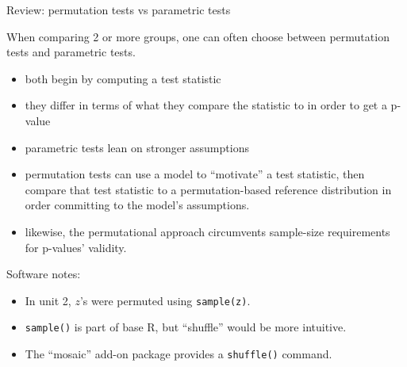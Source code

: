 \begin{frame}[<+->]{Review: permutation tests vs parametric tests}

When comparing 2 or more groups, one can often choose between permutation tests and parametric tests.
\begin{itemize}
\item both begin by computing a test statistic
\item they differ in terms of what they compare the statistic to in order to get a p-value
\item parametric tests lean on stronger assumptions
\item permutation tests can use a model to ``motivate'' a test statistic, then compare that test statistic to a permutation-based reference distribution in order committing to the model's assumptions.
\item likewise, the permutational approach circumvents sample-size requirements for p-values' validity.
\end{itemize}

Software notes:
\begin{itemize}
\item In unit 2, $z$'s were permuted using \texttt{sample(z)}.
\item \texttt{sample()} is part of base R, but ``\textrm{shuffle}'' would be more intuitive.
\item The ``mosaic'' add-on package provides a \texttt{shuffle()} command. 
\end{itemize}

\end{frame}

